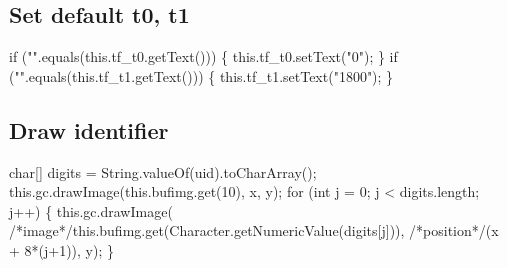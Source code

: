 \subsection{Set default t0, t1}
\nwenddocs{}\endmoddef{}
if ("".equals(this.tf_t0.getText())) \{
  this.tf_t0.setText("0");
\}
if ("".equals(this.tf_t1.getText())) \{
  this.tf_t1.setText("1800");
\}
\nwendcode{}\nwdocspar

\subsection{Draw identifier}
\nwenddocs{}\endmoddef{}
char[] digits = String.valueOf(uid).toCharArray();
this.gc.drawImage(this.bufimg.get(10), x, y);
for (int j = 0; j < digits.length; j++) \{
  this.gc.drawImage(
    /*image*/this.bufimg.get(Character.getNumericValue(digits[j])),
    /*position*/(x + 8*(j+1)), y);
\}
\nwendcode{}\nwdocspar


